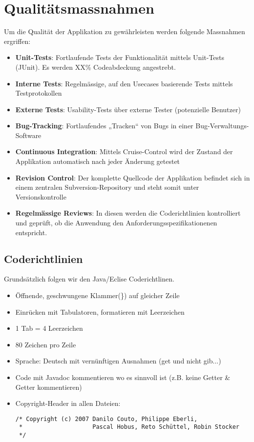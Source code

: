 \documentclass[a4paper,12pt,halfparskip,DIV14]{scrreprt}
\begin{document}
\section{Qualitätsmassnahmen}

Um die Qualität der Applikation zu gewährleisten werden folgende Massnahmen ergriffen:
\begin{itemize}
	\item \textbf{Unit-Tests}: Fortlaufende Tests der Funktionalität mittels Unit-Tests (JUnit). Es werden XX\% Codeabdeckung angestrebt.
	\item \textbf{Interne Tests}: Regelmässige, auf den Usecases basierende Tests mittels Testprotokollen
	\item \textbf{Externe Tests}: Usability-Tests über externe Tester (potenzielle Benutzer)
	\item \textbf{Bug-Tracking}: Fortlaufendes „Tracken“ von Bugs in einer Bug-Verwaltungs-Software
	\item \textbf{Continuous Integration}: Mittels Cruise-Control wird der Zustand der Applikation automatisch nach jeder Änderung getestet
	\item \textbf{Revision Control}: Der komplette Quellcode der Applikation befindet sich in einem zentralen Subversion-Repository und steht somit unter Versionskontrolle
	\item \textbf{Regelmässige Reviews}: In diesen werden die Coderichtlinien kontrolliert und geprüft, ob die Anwendung den Anforderungsspezifikationenen entspricht. 
\end{itemize}

\subsection{Coderichtlinien}\label{sub:coderichtlinien} %
Grundsätzlich folgen wir den Java/Eclise Coderichtlinen.
\begin{itemize}
  \item Öffnende, geschwungene Klammer(\}) auf gleicher Zeile
  \item Einrücken mit Tabulatoren, formatieren mit Leerzeichen
  \item 1 Tab = 4 Leerzeichen
  \item 80 Zeichen pro Zeile
  \item Sprache: Deutsch mit vernünftigen Ausnahmen (get und nicht gib...)
  \item Code mit Javadoc kommentieren wo es sinnvoll ist (z.B. keine Getter \& Getter kommentieren)
  \item Copyright-Header in allen Dateien:
    \begin{verbatim}
/* Copyright (c) 2007 Danilo Couto, Philippe Eberli,
 *                    Pascal Hobus, Reto Schüttel, Robin Stocker
 */
    \end{verbatim}
\end{itemize}
\end{document}
